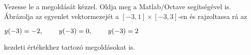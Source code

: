 Vezesse le a 
\de{} megoldását kézzel.
Oldja meg a Matlab/Octave   segítségével is. 
Ábrázolja az egyenlet vektormezejét a $[-3,1]\times [-3,3]$-en és 
rajzoltassa rá az 
\centerline{$y(-3)=-2, \hspace{0.8cm} y(-3)=0, \hspace{0.8cm} y(-3)=2$} 
kezdeti értékekhez tartozó megoldásokat is.


